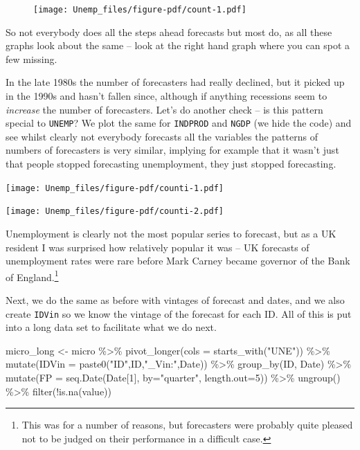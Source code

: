 \documentclass[
  letterpaper,
]{book}
\newenvironment{Shaded}{\begin{snugshade}}{\end{snugshade}}
\newcommand{\AttributeTok}[1]{\textcolor[rgb]{0.40,0.45,0.13}{#1}}
\newcommand{\DecValTok}[1]{\textcolor[rgb]{0.68,0.00,0.00}{#1}}
\newcommand{\FunctionTok}[1]{\textcolor[rgb]{0.28,0.35,0.67}{#1}}
\newcommand{\NormalTok}[1]{\textcolor[rgb]{0.00,0.23,0.31}{#1}}
\newcommand{\OtherTok}[1]{\textcolor[rgb]{0.00,0.23,0.31}{#1}}
\newcommand{\SpecialCharTok}[1]{\textcolor[rgb]{0.37,0.37,0.37}{#1}}
\newcommand{\StringTok}[1]{\textcolor[rgb]{0.13,0.47,0.30}{#1}}
\begin{document}
\begin{figure}[H]

{\centering \texttt{[image: Unemp\_files/figure-pdf/count-1.pdf]}

}

\end{figure}

So not everybody does all the steps ahead forecasts but most do, as all
these graphs look about the same -- look at the right hand graph where
you can spot a few missing.

In the late 1980s the number of forecasters had really declined, but it
picked up in the 1990s and hasn't fallen since, although if anything
recessions seem to \emph{increase} the number of forecasters. Let's do
another check -- is this pattern special to \texttt{UNEMP}? We plot the
same for \texttt{INDPROD} and \texttt{NGDP} (we hide the code) and see
whilst clearly not everybody forecasts all the variables the patterns of
numbers of forecasters is very similar, implying for example that it
wasn't just that people stopped forecasting unemployment, they just
stopped forecasting.

\texttt{[image: Unemp\_files/figure-pdf/counti-1.pdf]}

\texttt{[image: Unemp\_files/figure-pdf/counti-2.pdf]}

Unemployment is clearly not the most popular series to forecast, but as
a UK resident I was surprised how relatively popular it was -- UK
forecasts of unemployment rates were rare before Mark Carney became
governor of the Bank of England.\footnote{This was for a number of
  reasons, but forecasters were probably quite pleased not to be judged
  on their performance in a difficult case.}

Next, we do the same as before with vintages of forecast and dates, and
we also create \texttt{IDVin} so we know the vintage of the forecast for
each ID. All of this is put into a long data set to facilitate what we
do next.

\begin{Shaded}
\begin{Highlighting}[]
\NormalTok{micro\_long }\OtherTok{\textless{}{-}}\NormalTok{ micro }\SpecialCharTok{\%\textgreater{}\%} 
  \FunctionTok{pivot\_longer}\NormalTok{(}\AttributeTok{cols =} \FunctionTok{starts\_with}\NormalTok{(}\StringTok{"UNE"}\NormalTok{)) }\SpecialCharTok{\%\textgreater{}\%} 
  \FunctionTok{mutate}\NormalTok{(}\AttributeTok{IDVin =} \FunctionTok{paste0}\NormalTok{(}\StringTok{"ID"}\NormalTok{,ID,}\StringTok{"\_Vin:"}\NormalTok{,Date)) }\SpecialCharTok{\%\textgreater{}\%} 
  \FunctionTok{group\_by}\NormalTok{(ID, Date) }\SpecialCharTok{\%\textgreater{}\%} 
  \FunctionTok{mutate}\NormalTok{(}\AttributeTok{FP =} \FunctionTok{seq.Date}\NormalTok{(Date[}\DecValTok{1}\NormalTok{], }\AttributeTok{by=}\StringTok{"quarter"}\NormalTok{, }\AttributeTok{length.out=}\DecValTok{5}\NormalTok{)) }\SpecialCharTok{\%\textgreater{}\%}
  \FunctionTok{ungroup}\NormalTok{() }\SpecialCharTok{\%\textgreater{}\%} 
  \FunctionTok{filter}\NormalTok{(}\SpecialCharTok{!}\FunctionTok{is.na}\NormalTok{(value)) }
\end{Highlighting}
\end{Shaded}
\end{document}
